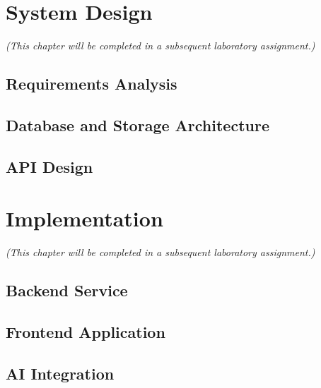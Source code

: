 \documentclass[12pt, a4paper]{report}
\begin{document}
\chapter{System Design}
\label{chap:design}

\textit{(This chapter will be completed in a subsequent laboratory assignment.)}

\section{Requirements Analysis}
\label{sec:requirements}

\section{Database and Storage Architecture}
\label{sec:db-storage}

\section{API Design}
\label{sec:api-design}

\chapter{Implementation}
\label{chap:implementation}

\textit{(This chapter will be completed in a subsequent laboratory assignment.)}

\section{Backend Service}
\label{sec:backend}

\section{Frontend Application}
\label{sec:frontend}

\section{AI Integration}
\label{sec:ai-integration}
\end{document}
